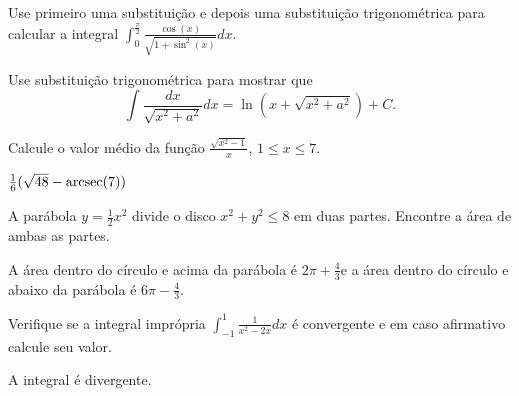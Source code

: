 \begin{exercises}
\begin{exercise}
Use primeiro uma substituição e depois uma substituição trigonométrica
para calcular a integral
\(\int_0^{\frac{\pi}{2}} \frac{\cos(x)}{\sqrt{1+\sin^2(x)}}dx\).
\end{exercise}

\begin{exercise}
Use substituição trigonométrica para mostrar que
\[
  \int \frac{dx}{\sqrt{x^2+a^2}}dx= \ln(x+ \sqrt{x^2+a^2})+C.
\]
\end{exercise}

\begin{exercise}
Calcule o valor médio da função $\frac{\sqrt{x^2-1}}{x}$, $1 \leq x \leq 7$.
\begin{answer}
  $\frac{1}{6}(\sqrt{48}- \operatorname{arcsec}(7))$
\end{answer}
\end{exercise}

\begin{exercise}
  A parábola $y=\frac{1}{2}x^2$ divide o disco $x^2+y^2 \leq 8$ em duas partes.
  Encontre a área de ambas as partes.
  \begin{answer}
    A área dentro do círculo e acima da parábola é $2\pi +\frac{4}{3}$e a
    área dentro do círculo e abaixo da parábola é $6\pi -\frac{4}{3}$.
  \end{answer}
\end{exercise}
\begin{exercise}
Verifique se a integral imprópria $\int_{-1}^1 \frac{1}{x^2-2x} dx$ é
convergente e em caso afirmativo calcule seu valor.
\begin{answer}
A integral é divergente.
\end{answer}
\end{exercise}


\end{exercises}

